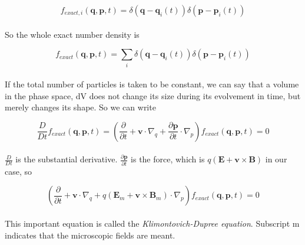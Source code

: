 \documentclass[a4paper,10pt]{report}
\begin{document}
\begin{equation}\label{exact_number_density_one_particle}
    f_{exact,i}(\mathbf{q,p},t)=\delta(\mathbf{q}-\mathbf{q}_i(t))\delta(\mathbf{p}-\mathbf{p}_i(t))
\end{equation}

\paragraph*{}
So the whole exact number density is

\begin{equation}\label{exact_number_density}
    f_{exact}(\mathbf{q,p},t)=\sum_i \delta(\mathbf{q}-\mathbf{q}_i(t))\delta(\mathbf{p}-\mathbf{p}_i(t))
\end{equation}

\paragraph*{}
If the total number of particles is taken to be constant, we can say that a volume in the phase space, dV does not change its size during its evolvement in time, but merely changes its shape. So we can write

\begin{equation}\label{erhaltung_exact_number_density}
    \frac{D}{Dt}f_{exact}(\mathbf{q,p},t)=\left( \frac{\partial}{\partial t} + \mathbf{v}\cdot \nabla_q+\frac{\partial \mathbf{p}}{\partial t}\cdot\nabla_p \right) f_{exact}(\mathbf{q,p},t)=0
\end{equation}

\paragraph*{}
$\frac{D}{Dt}$ is the substantial derivative. $\frac{\partial \mathbf{p}}{\partial t}$ is the force, which is $q(\mathbf{E}+\mathbf{v}\times \mathbf{B})$ in our case, so

\begin{equation}\label{Klimontovich-Dupree}
    \left( \frac{\partial}{\partial t} + \mathbf{v}\cdot \nabla_q+q(\mathbf{E}_m+\mathbf{v}\times \mathbf{B}_m)\cdot\nabla_p \right) f_{exact}(\mathbf{q,p},t)=0
\end{equation}

\paragraph*{}
This important equation is called the \emph{Klimontovich-Dupree equation}. Subscript m indicates that the microscopic fields are meant.
\end{document}

